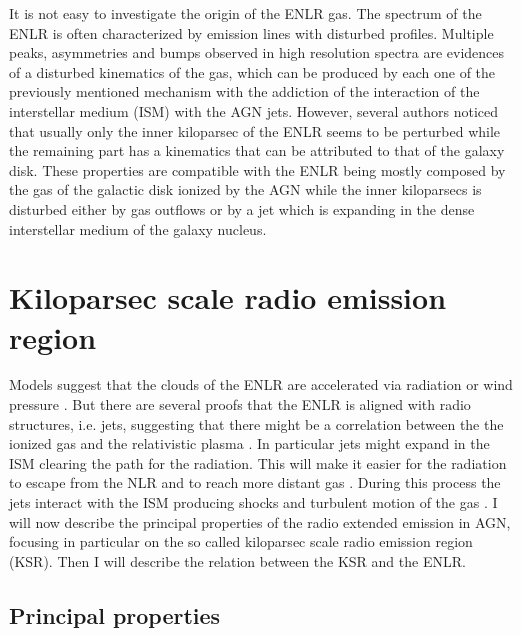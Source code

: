 \documentclass[../main.tex]{subfiles}
\begin{document}
It is not easy to investigate the origin of the ENLR gas.
The spectrum of the ENLR is often characterized by emission lines with disturbed profiles.
Multiple peaks, asymmetries and bumps observed in high resolution spectra \citep{Ozaki09,Morganti07,Congiu17} are evidences of a disturbed kinematics of the gas, which can be produced by each one of the previously mentioned mechanism with the addiction of the interaction of the interstellar medium (ISM) with the AGN jets.
However, several authors \citep[e.g.][]{Unger87,Fischer17,Fischer18} noticed that usually only the inner kiloparsec of the ENLR seems to be perturbed while the remaining part has a kinematics that can be attributed to that of the galaxy disk.
These properties are compatible with the ENLR being mostly composed by the gas of the galactic disk ionized by the AGN while the inner kiloparsecs is disturbed either by gas outflows or by a jet which is expanding in the dense interstellar medium of the galaxy nucleus.



\section{Kiloparsec scale radio emission region}
\label{sec:ksr}

Models suggest that the clouds of the ENLR are accelerated via radiation or wind pressure \citep{Crenshaw00,Crenshaw00b}.
But there are several proofs that the ENLR is aligned with radio structures, i.e. jets, suggesting that there might be a correlation between the the ionized gas and the relativistic plasma \citep[e.g.][]{Unger87,Wilson94,Falcke98,Schmitt03,Schmitt03b,Morganti07,Husemann13}.
In particular jets might expand in the ISM clearing the path for the radiation.
This will make it easier for the radiation to escape from the NLR and to reach more distant gas \citep{Wilson94}.
During this process the jets interact with the ISM producing shocks and turbulent motion of the gas \citep[e.g.][]{Cracco11,Contini13,Congiu17}.
I will now describe the principal properties of the radio extended emission in AGN, focusing in particular on the so called kiloparsec scale radio emission region (KSR).
Then I will describe the relation between the KSR and the ENLR.

\subsection{Principal properties}
\label{sec:princ_prop}
\end{document}
